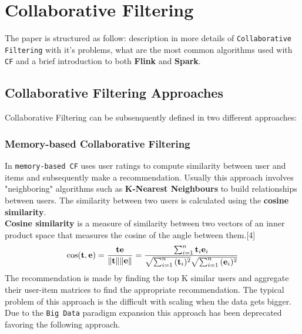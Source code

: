 \documentclass{sig-alternate-05-2015}
\begin{document}
\section{Collaborative Filtering}

The paper is structured as follow: description in more details
of \texttt{Collaborative Filtering} with it's problems, what are
the most common algorithms used with \texttt{CF} and a brief
introduction to both \textbf{Flink} and \textbf{Spark}.



\subsection{Collaborative Filtering Approaches}


Collaborative Filtering can be subsenquently defined in two
different approaches:

\subsubsection{Memory-based Collaborative Filtering}
In \texttt{memory-based CF} uses user ratings to compute similarity
between user and items and subsequently make a recommendation. Usually
this approach involves "neighboring" algorithms such as \textbf{K-Nearest Neighbours}
to build relationships between users. The similarity between two users
is calculated using the \textbf{cosine similarity}.\\
\textbf{Cosine similarity} is a measure of similarity between two vectors of an inner product space that measures the cosine of the angle between them.[4]
\begin{equation}
\cos ({\bf t},{\bf e})= {{\bf t} {\bf e} \over \|{\bf t}\| \|{\bf e}\|} = \frac{ \sum_{i=1}^{n}{{\bf t}_i{\bf e}_i} }{ \sqrt{\sum_{i=1}^{n}{({\bf t}_i)^2}} \sqrt{\sum_{i=1}^{n}{({\bf e}_i)^2}} }
\end{equation}
The recommendation is made by finding the top K similar users and aggregate their
user-item matrices to find the appropriate recommendation.
The typical problem of this approach is the difficult with scaling
when the data gets bigger. Due to the \texttt{Big Data} paradigm expansion
this approach has been deprecated favoring the following approach.
\end{document}

